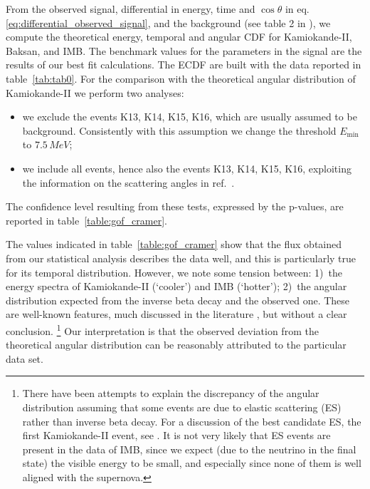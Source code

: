 \documentclass[a4paper,11pt]{article}
\begin{document}
From the observed signal, differential in energy, time and $\cos \theta$ in eq.\,\eqref{eq:differential_observed_signal}, and the background (see table 2 in \cite{Vissani:2014doa}), we compute the theoretical energy, temporal and angular CDF for Kamiokande-II, Baksan, and IMB. The benchmark values for the parameters in the signal are the results of our best fit calculations.
%
The ECDF are built %
with the data 
reported %
in table~\ref{tab:tab0}. For the comparison with the theoretical angular distribution of Kamiokande-II we perform two analyses: 
\begin{itemize}
\item[1]
we exclude the events K13, K14, K15, K16, which are usually assumed to be background. 
Consistently with this assumption 
we change the threshold $E_{\min}$ to $7.5\,\unit{MeV}$; 
\item[2]
we include all events, hence also the events K13, K14, K15, K16, exploiting the information on the scattering angles in ref.~\cite{Krivoruchenko:1988zg}.
\end{itemize}
%
%
The confidence level resulting  from these tests, expressed by the p-values, are reported in table~\ref{table:gof_cramer}. 

The values indicated in table~\ref{table:gof_cramer} show that the flux obtained from our statistical analysis describes the data well, and this is particularly true for its temporal distribution. However, we note  some tension between: 1)~the energy spectra of Kamiokande-II (‘cooler’) and IMB (‘hotter’); 2)~the angular distribution expected from the inverse beta decay and the observed one. These are well-known features, much discussed in the literature \cite{Malgin:1998wm, Krivoruchenko:1988zg,Costantini:2004ry}, 
  but without a clear conclusion.
  \footnote{There have been attempts to explain the discrepancy of the angular distribution assuming that some events are due to elastic scattering (ES) rather than inverse beta decay. 
For a discussion of the best candidate ES, the first Kamiokande-II event, see \cite{Costantini:2004ry,Vissani:2008wbj}.
It is not very likely that ES events are present in the data of IMB, since we expect (due to the neutrino in the final state) the visible energy to be small, and especially since none of them is well aligned with the supernova.}
%
Our %
interpretation is that
 the observed deviation from the theoretical angular distribution can be reasonably attributed to the particular data set.
\end{document}
